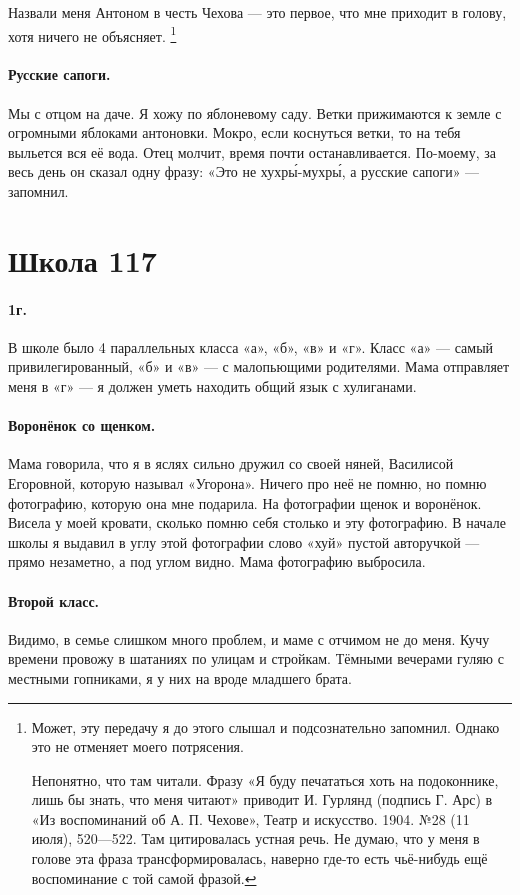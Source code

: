 \documentclass{book}
\begin{document}
Назвали меня Антоном в честь Чехова --- это первое, что мне приходит в голову,
хотя ничего не объясняет.%
\footnote{Может, эту передачу я до этого слышал и подсознательно запомнил.
Однако это не отменяет моего потрясения.

Непонятно, что там читали. 
Фразу «Я буду печататься хоть на подоконнике, лишь бы знать, что меня читают» приводит И. Гурлянд (подпись Г. Арс) в  «Из воспоминаний об А. П. Чехове», Театр и искусство. 1904. №28 (11 июля), 520---522.
Там цитировалась устная речь.
Не думаю, что у меня в голове эта фраза трансформировалась, наверно где-то есть чьё-нибудь ещё воспоминание с той самой фразой.}

\paragraph{Русские сапоги.}
Мы с отцом на даче.
Я хожу по яблоневому саду.
Ветки прижимаются к земле с огромными яблоками антоновки.
Мокро, если коснуться ветки, то на тебя выльется вся её вода.
Отец молчит,
время почти останавливается.
По-моему, за весь день он сказал одну фразу: 
«Это не хухр\'{ы}-мухр\'{ы}, а русские сапоги» --- запомнил.

\section*{Школа 117}

\paragraph{1г.}В школе было 4 параллельных класса «а», «б», «в» и «г».
Класс «а» --- самый привилегированный, «б» и «в» --- с малопьющими родителями.
Мама отправляет меня в «г» --- я должен уметь находить общий язык с хулиганами.

\paragraph{Воронёнок со щенком.}
Мама говорила, что я в яслях сильно дружил со своей няней, Василисой Егоровной,
которую называл «Угорона».
Ничего про неё не помню, но помню фотографию, которую она мне подарила.
На фотографии щенок и воронёнок.
Висела у моей кровати, сколько помню себя столько и эту фотографию.
В начале школы я выдавил в углу этой фотографии слово «хуй» пустой авторучкой --- прямо незаметно, а под углом видно.
Мама фотографию выбросила.

\paragraph{Второй класс.} 
Видимо, в семье слишком много проблем, и маме с отчимом не до меня.
Кучу времени провожу в шатаниях по улицам и стройкам.
Тёмными вечерами гуляю с местными гопниками, 
я у них на вроде младшего брата.
\end{document}
